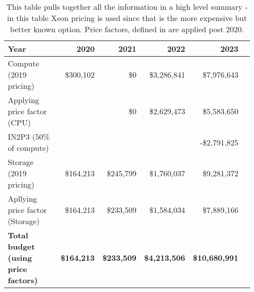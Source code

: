 \tiny \begin{longtable} { |p{}  |r  |r  |r  |r  |r |} 
\caption{This table pulls together all the information in a high level summary - in this table Xeon pricing is used since that is the more expensive but better known option. Price factors, defined in  are applied post 2020.
 \label{tab:Summary}}\\ 
\hline 
\textbf{Year}&\textbf{2020}&\textbf{2021}&\textbf{2022}&\textbf{2023} \\ \hline
{Compute (2019 pricing)}&{\$300,102}&{\$0}&{\$3,286,841}&{\$7,976,643} \\ \hline
{Applying price factor (CPU)}&{}&{\$0}&{\$2,629,473}&{\$5,583,650} \\ \hline
{IN2P3 (50\% of compute)}&{}&{}&{}&{-\$2,791,825} \\ \hline
{Storage (2019 pricing)}&{\$164,213}&{\$245,799}&{\$1,760,037}&{\$9,281,372} \\ \hline
{Apllying price factor (Storage)}&{\$164,213}&{\$233,509}&{\$1,584,034}&{\$7,889,166} \\ \hline
\textbf{Total budget (using price factors)}&\textbf{\$164,213}&\textbf{\$233,509}&\textbf{\$4,213,506}&\textbf{\$10,680,991} \\ \hline
\end{longtable} \normalsize
